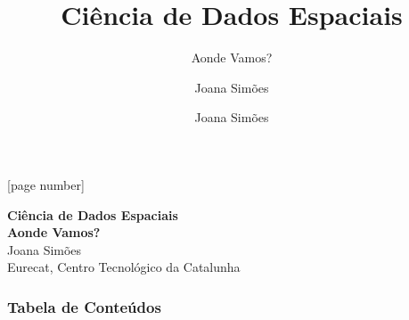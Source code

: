 \documentclass[hyperref={pdfpagelabels=true}]{beamer}
\title{Ci\^{e}ncia de Dados Espaciais}
\subtitle{Aonde Vamos?}
\author{Joana Sim\~{o}es}
\author[shortname]{Joana Sim\~{o}es \inst{1}}
\institute[shortinst]{\inst{1} Eurecat, Centro Tecnol\'{o}gico da Catalunha}
\begin{document}
[page number]


{  
\begin{frame}[plain]
    \vspace{10em}
    \begin{titleBox}
        \centering \textbf{Ci\^{e}ncia de Dados Espaciais}\\
        \textbf{Aonde Vamos?}\\  
        \justify
        \small{Joana Sim\~{o}es}\\
        \small{Eurecat, Centro Tecnol\'{o}gico da Catalunha\\
        }
        
    \end{titleBox}

\end{frame} 
} 
 
\begin{frame}
\frametitle{Tabela de Conte\'{u}dos}
\tableofcontents
\end{frame}

\end{document}
